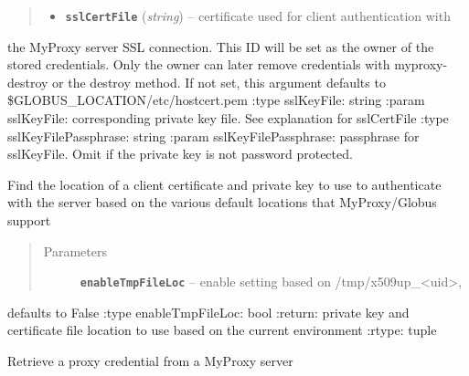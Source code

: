 \documentclass[letterpaper,10pt,english]{sphinxmanual}
\begin{document}
\begin{fulllineitems}
\begin{fulllineitems}
\begin{quote}
\begin{description}
\begin{itemize}
\item {} 
\textbf{\texttt{sslCertFile}} (\emph{string}) -- certificate used for client authentication with

\end{itemize}

\end{description}\end{quote}

the MyProxy server SSL connection.  This ID will be set as the owner
of the stored credentials.  Only the owner can later remove 
credentials with myproxy-destroy or the destroy method.  If not set,
this argument defaults to \$GLOBUS\_LOCATION/etc/hostcert.pem 
:type sslKeyFile: string 
:param sslKeyFile: corresponding private key file.  See explanation
for sslCertFile
:type sslKeyFilePassphrase: string
:param sslKeyFilePassphrase: passphrase for sslKeyFile.  Omit if the
private key is not password protected.

\end{fulllineitems}


\begin{fulllineitems}
\label{client:myproxy.client.MyProxyClient.locateClientCredentials}
Find the location of a client certificate and private key to use to 
authenticate with the server based on the various default locations
that MyProxy/Globus support
\begin{quote}\begin{description}
\item[{Parameters}] \leavevmode
\textbf{\texttt{enableTmpFileLoc}} -- enable setting based on /tmp/x509up\_\textless{}uid\textgreater{},

\end{description}\end{quote}

defaults to False
:type enableTmpFileLoc: bool
:return: private key and certificate file location to use based on the
current environment
:rtype: tuple

\end{fulllineitems}


\begin{fulllineitems}
\label{client:myproxy.client.MyProxyClient.logon}
Retrieve a proxy credential from a MyProxy server


\end{fulllineitems}
\end{fulllineitems}
\end{document}
